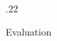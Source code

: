 \documentclass[final]{beamer}
\newcommand{\setblocksize}{\LARGE \centering}
\newcommand{\sidecolumnwidth}{.22}
\begin{document}
\begin{frame}{}
\begin{columns}[t]
\begin{column}{\sidecolumnwidth\linewidth}
\begin{block}{\setblocksize Evaluation}
{}
\end{block}

\end{column}	%

\end{columns}

\end{frame}
\end{document}
